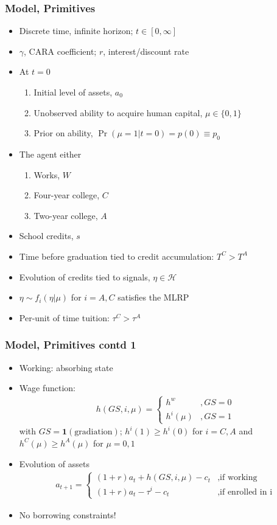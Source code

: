 \begin{frame}
	\frametitle{Model, Primitives}
		\begin{itemize}
			\item Discrete time, infinite horizon; $t \in [0, \infty]$
			\item $\gamma$, CARA coefficient; $r$, interest/discount rate
			\item At $t=0$
				\begin{enumerate}
					\item Initial level of assets, $a_{0}$
					\item Unobserved ability to acquire human capital, $\mu \in \{0,1\}$
					\item Prior on ability, $\Pr(\mu = 1|t=0) = p(0) \equiv p_{0}$
				\end{enumerate}	
			\item The agent either
				\begin{enumerate}
					\item Works, $W$
					\item Four-year college, $C$
					\item Two-year college, $A$
				\end{enumerate}
			\item School credits, $s$
			\item Time before graduation tied to credit accumulation: $T^C > T^A$
			\item Evolution of credits tied to signals, $\eta \in \mathcal{H}$
			\item $\eta \sim f_{i}(\eta|\mu)$ for $i = A,C$ satisfies the MLRP
			\item Per-unit of time tuition: $\tau^C > \tau^A$
		\end{itemize}
\end{frame}

\begin{frame}
	\frametitle{Model, Primitives contd 1}
		\begin{itemize}
			\item Working: absorbing state
			\item Wage function:
				\begin{eqnarray}
					h(GS, i, \mu) = 
						\begin{cases}
							h^w &, GS = 0 \\
							h^i(\mu) &, GS =1
						\end{cases}
				\end{eqnarray}
\noindent with $GS = \mathbf{1}(\text{gradiation})$; $h^i (1) \geq h^i (0)$ for $i = C,A$ and $h^C(\mu) \geq h^A(\mu)$ for $\mu = 0,1$
			\item Evolution of assets
				\begin{eqnarray}
					a_{t+1} =
						\begin{cases}
							(1 + r)a_{t} + h(GS,i,\mu) - c_{t} &, \text{if working} \\
							(1+r)a_{t} - \tau^i - c_{t} &, \text{if enrolled in i}  \label{eq:a}
						\end{cases}
				\end{eqnarray}
				\item No borrowing constraints!
			\end{itemize}							
\end{frame}

